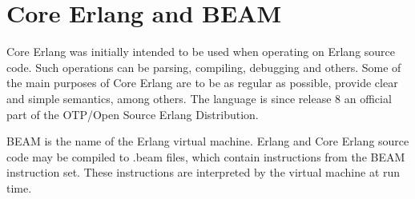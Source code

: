 \section{Core Erlang and BEAM}


Core Erlang \cite{CoreErlangIntro} was initially intended to be used when operating on Erlang source code. Such operations can be parsing, compiling, debugging and others. Some of the main purposes of Core Erlang are to be as regular as possible, provide clear and simple semantics, among others. The language is since release 8 an official part of the OTP/Open Source Erlang Distribution. 

BEAM is the name of the Erlang virtual machine. Erlang and Core Erlang source code may be compiled to .beam files, which contain instructions from the BEAM instruction set. These instructions are interpreted by the virtual machine at run time.